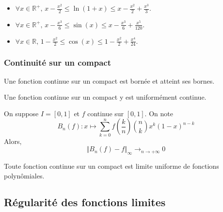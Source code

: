   \begin{application}
    \begin{itemize}
      \item $\forall x \in \mathbb{R}^+, \, x - \frac{x^2}{2} \leq \ln(1+x) \leq x - \frac{x^2}{2} + \frac{x^3}{3}$.
      \item $\forall x \in \mathbb{R}^+, \, x - \frac{x^3}{6} \leq \sin(x) \leq x - \frac{x^3}{6} + \frac{x^5}{120}$.
      \item $\forall x \in \mathbb{R}, \, 1 - \frac{x^2}{2} \leq \cos(x) \leq 1 - \frac{x^2}{2} + \frac{x^4}{24}$.
    \end{itemize}
  \end{application}

  \subsubsection{Continuité sur un compact}


  \begin{proposition}
    Une fonction continue sur un compact est bornée et atteint ses bornes.
  \end{proposition}

  \begin{theorem}[Heine]
    Une fonction continue sur un compact y est uniformément continue.
  \end{theorem}


  \begin{theorem}[Bernstein]
    On suppose $I = [0,1]$ et $f$ continue sur $[0,1]$. On note
    \[ B_n(f) : x \mapsto \sum_{k=0}^{n} f\left(\frac{k}{n}\right) \binom{n}{k} x^k (1-x)^{n-k} \]
    Alors,
    \[ \Vert B_n(f) - f \Vert_\infty \longrightarrow_{n \rightarrow +\infty} 0 \]
  \end{theorem}


  \begin{theorem}[Weierstrass]
    Toute fonction continue sur un compact est limite uniforme de fonctions polynômiales.
  \end{theorem}

  \subsection{Régularité des fonctions limites}

